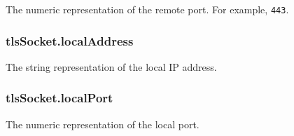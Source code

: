 The numeric representation of the remote port. For example,
\texttt{443}.

\subsubsection{tlsSocket.localAddress}\label{tlssocket.localaddress}

The string representation of the local IP address.

\subsubsection{tlsSocket.localPort}\label{tlssocket.localport}

The numeric representation of the local port.
